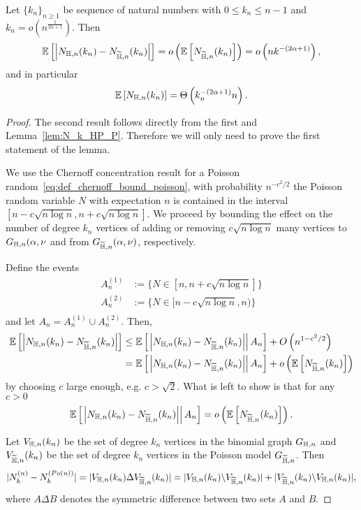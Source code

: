 \begin{lemma}\label{lem:diff_Nk_hyperbolic_binomial_poisson}
Let $\{k_n\}_{n \ge 1}$ be sequence of natural numbers with $0 \leq k_n \leq n-1$ and $k_n = o(n^{\frac{1}{2\alpha+1}})$. Then
\[
	\mathbb{E}\left[\left|N_{\mathbb{H},n}(k_n)-N_{\widetilde{\mathbb{H}},n}(k_n)\right|\right] = o\left(\mathbb{E}\left[N_{\widetilde{\mathbb{H}},n}(k_n)\right]\right) = o\left(n k^{-(2\alpha+1)}\right),
\]
and in particular
\[
	\mathbb{E}\left[N_{\mathbb{H},n}(k_n)\right] = \Theta\left(k_n^{-(2\alpha + 1)} n\right).
\]
\end{lemma}
\begin{proof}
The second result follows directly from the first and Lemma~\ref{lem:N_k_HP_P}. Therefore we will only need to prove the first statement of the lemma.

We use the Chernoff concentration result for a Poisson random~\eqref{eq:def_chernoff_bound_poisson}, with probability $n^{-c^2/2}$ the Poisson random variable $N$ with expectation $n$ is contained in the interval $[n-c\sqrt{n\log n},n+c\sqrt{n \log n}]$. We proceed by bounding the effect on the number of degree $k_n$ vertices of adding or removing $c\sqrt{n\log n}$ many vertices to $G_{\mathbb{H},n}(\alpha,\nu$ and from $G_{\widetilde{\mathbb{H}},n}(\alpha,\nu)$, respectively.

Define the events
\begin{align*}
	A_n^{(1)} &:= \{N \in [n, n+c\sqrt{n \log n}]\}\\
	A_n^{(2)} &:= \{N \in [n-c\sqrt{n\log n}, n)\}\\
\end{align*}
and let $A_n = A_n^{(1)} \cup A_n^{(2)}$. Then,
\begin{align*}
\mathbb{E}\left[\left|N_{\mathbb{H},n}(k_n)-N_{\widetilde{\mathbb{H}},n}(k_n)\right|\right] 
&\le \mathbb{E}\left[\left.\left|N_{\mathbb{H},n}(k_n)-N_{\widetilde{\mathbb{H}},n}(k_n)\right|\right|A_n\right] + O\left(n^{1 - c^2/2}\right)\\
&= \mathbb{E}\left[\left.\left|N_{\mathbb{H},n}(k_n)-N_{\widetilde{\mathbb{H}},n}(k_n)\right|\right|A_n\right] + o\left(\mathbb{E}\left[N_{\widetilde{\mathbb{H}},n}(k_n)\right]\right)
\end{align*}
by choosing $c$ large enough, e.g. $c > \sqrt{2}$. What is left to show is that for any $c > 0$
\[
	 \mathbb{E}\left[\left.\left|N_{\mathbb{H},n}(k_n)-N_{\widetilde{\mathbb{H}},n}(k_n)\right|\right|A_n\right] = o\left(\mathbb{E}\left[N_{\widetilde{\mathbb{H}},n}(k_n)\right]\right).
\]


Let $V_{\mathbb{H},n}(k_n)$ be the set of degree $k_n$ vertices in the binomial graph $G_{\mathbb{H},n}$ and $V_{\widetilde{\mathbb{H}},n}(k_n)$ be the set of degree $k_n$ vertices in the Poisson model $G_{\widetilde{\mathbb{H}},n}$. Then 
\[
	|N_k^{(n)}-N_k^{(Po(n))}| = |V_{\mathbb{H},n}(k_n) \Delta V_{\widetilde{\mathbb{H}},n}(k_n)| = |V_{\mathbb{H},n}(k_n) \backslash V_{\widetilde{\mathbb{H}},n}(k_n) | + |V_{\widetilde{\mathbb{H}},n}(k_n) \backslash V_{\mathbb{H},n}(k_n) |,
\]
where $A \Delta B$ denotes the symmetric difference between two sets $A$ and $B$.


\end{proof}
